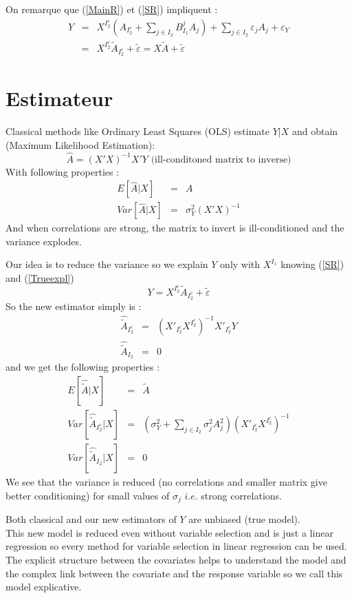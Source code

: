 \documentclass[12pt]{article}
\begin{document}
On remarque que (\ref{MainR}) et (\ref{SR}) impliquent :
\begin{eqnarray}
	Y&=&X^{I_2^c} (A_{I_2^c}+ \sum_{j \in I_2}B^{j}_{I_1}A_{j})+  \sum_{j \in I_2}\varepsilon_{j}A_{j}+\varepsilon_Y \\
					&=& X^{I_2^c}\tilde{A}_{I_2^c}+ \tilde{\varepsilon}=X\tilde{A}+ \tilde{\varepsilon}\label{Trueexpl} 			
\end{eqnarray}
\section{Estimateur}
	Classical methods like Ordinary Least Squares (OLS) estimate $Y|X$ and obtain (Maximum Likelihood Estimation): 
		\begin{equation}
			\hat A = (X'X)^{-1}X'Y \textrm{ (ill-conditoned matrix to inverse)}
		\end{equation}
		With following properties :
		\begin{eqnarray}
			E[\hat{A}|X]&=&A \\
			Var[\hat{A}|X]&=& \sigma_Y^2(X'X)^{-1}
		\end{eqnarray}				
		And when correlations are strong, the matrix to invert is ill-conditioned and the variance explodes.
 			
		Our idea is to reduce the variance so we explain $Y$ only with $X^{I_1}$ knowing (\ref{SR}) and (\ref{Trueexpl})
			\begin{equation}
				Y= X^{I_2^c}\tilde{A}_{I_2^c}+ \tilde{\varepsilon}\label{explicatif}
			\end{equation}							
		So the new estimator simply is : 
		\begin{eqnarray}
			\hat{\tilde{A}}_{I_2^c} &=& (X'_{I_2^c} X^{I_2^c})^{-1}X'_{I_2^c}Y \\
			\hat{\tilde{A}}_{I_2} &=& 0
		\end{eqnarray}
		and we get the following properties :
		\begin{eqnarray}
			E[\hat{\tilde{A}}|X]&=&\tilde{A} \\
			Var[\hat{\tilde{A}}_{I_2^c}|X]&=& (\sigma^2_Y+\sum_{j \in I_2}\sigma^2_{j}A_{j}^2 )(X'_{I_2^c} X^{I_2^c})^{-1} \\
			Var[\hat{\tilde{A}}_{I_2}|X]&=& 0 
		\end{eqnarray}
		We see that the variance is reduced (no correlations and smaller matrix give better conditioning) for small values of $\sigma_j$ $i.e.$ strong correlations.					
		
		Both classical and our new estimators of $Y$ are unbiased (true model)\cite{saporta2006probabilites}.
	\\	
			This new model is reduced even without variable selection and is just a linear regression so every method for variable selection in linear regression can be used. 
		 \\				
			The explicit structure between the covariates helps to understand the model and the complex link between the covariate and the response variable so we call this model explicative.	
			
\end{document}
